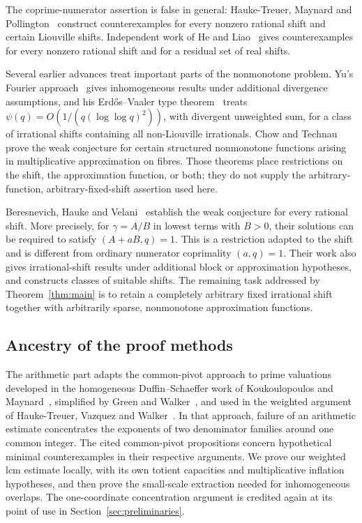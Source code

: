The coprime-numerator assertion is false in general: Hauke-Treuer,
Maynard and Pollington~\cite[Theorem~1]{HMP2026} construct
counterexamples for every nonzero rational shift and certain Liouville
shifts. Independent work of He and Liao~\cite[Theorems~1--2]{HL2026}
gives counterexamples for every nonzero rational shift and for a
residual set of real shifts.

Several earlier advances treat important parts of the nonmonotone
problem. Yu's Fourier approach~\cite{Yu2019} gives inhomogeneous
results under additional divergence assumptions, and his
Erdős--Vaaler type theorem~\cite[Theorem~1.3]{Yu2021} treats
$\psi(q)=O(1/(q(\log\log q)^2))$, with divergent unweighted sum,
for a class of irrational shifts containing all non-Liouville
irrationals. Chow and Technau~\cite[Theorem~1.23]{ChowTechnau2024}
prove the weak conjecture for certain structured nonmonotone
functions arising in multiplicative approximation on fibres.
Those theorems place restrictions on the shift, the approximation
function, or both; they do not supply the arbitrary-function,
arbitrary-fixed-shift assertion used here.

Beresnevich, Hauke and Velani~\cite[Theorem~14]{BHV2024} establish
the weak conjecture for every rational shift. More precisely, for
$\gamma=A/B$ in lowest terms with $B>0$, their solutions can be
required to satisfy $(A+aB,q)=1$. This is a restriction adapted to
the shift and is different from ordinary numerator coprimality
$(a,q)=1$. Their work also gives irrational-shift results under
additional block or approximation hypotheses, and constructs
classes of suitable shifts. The remaining task addressed by
Theorem~\ref{thm:main} is to retain a completely arbitrary fixed
irrational shift together with arbitrarily sparse, nonmonotone
approximation functions.

\subsection{Ancestry of the proof methods}

The arithmetic part adapts the common-pivot approach to prime
valuations developed in the homogeneous Duffin--Schaeffer work of
Koukoulopoulos and Maynard~\cite{KM2020}, simplified by Green and
Walker~\cite[Proposition~1.2 and Section~3]{GW2021}, and used in the
weighted argument of Hauke-Treuer, Vazquez and
Walker~\cite[Proposition~2.1]{HVW2026}. In that approach, failure of an
arithmetic estimate concentrates the exponents of two denominator
families around one common integer. The cited common-pivot
propositions concern hypothetical minimal counterexamples in their
respective arguments. We prove our weighted lcm estimate locally,
with its own totient capacities and multiplicative inflation
hypotheses, and then prove the small-scale extraction needed for
inhomogeneous overlaps. The one-coordinate concentration argument
is credited again at its point of use in Section~\ref{sec:preliminaries}.

